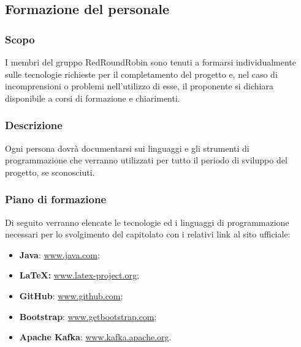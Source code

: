 \subsection{Formazione del personale}

	\subsubsection{Scopo}
		I membri del gruppo RedRoundRobin sono tenuti a formarsi individualmente sulle tecnologie richieste per il completamento del progetto e, nel caso di incomprensioni o problemi nell'utilizzo di esse, il proponente si dichiara disponibile a corsi di formazione e chiarimenti.
		
	\subsubsection{Descrizione}
		Ogni persona dovrà documentarsi sui linguaggi e gli strumenti di programmazione che verranno utilizzati per tutto il periodo di sviluppo del progetto, se sconosciuti.
		
	\subsubsection{Piano di formazione}
		Di seguito verranno elencate le tecnologie ed i linguaggi di programmazione necessari per lo svolgimento del capitolato con i relativi link al sito ufficiale:
		\begin{itemize}
			\item \textbf{Java}: \href{https://www.java.com/}{www.java.com};
			\item \textbf{\LaTeX{}:} \href{www.latex-project.org}{www.latex-project.org};
			\item \textbf{GitHub}: \href{www.github.com}{www.github.com};
			\item \textbf{Bootstrap}: \href{https://getbootstrap.com/}{www.getbootstrap.com};
			\item \textbf{Apache Kafka}: \href{https://kafka.apache.org/}{www.kafka.apache.org}.
		\end{itemize}

